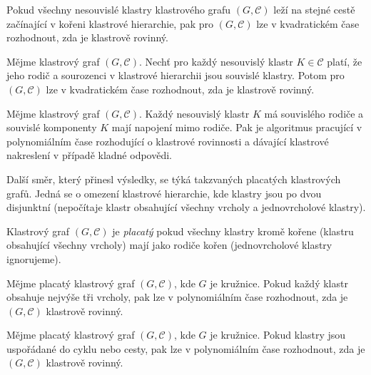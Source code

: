 \begin{theorem}
Pokud všechny nesouvislé klastry klastrového grafu $(G, \mathcal C)$ leží na stejné cestě začínající v kořeni klastrové hierarchie, pak pro $(G, \mathcal C)$ lze v kvadratickém čase rozhodnout, zda je klastrově rovinný.
\end{theorem}

\begin{theorem}
Mějme klastrový graf $(G, \mathcal C)$. Nechť pro každý nesouvislý klastr $K \in \mathcal C$ platí, že jeho rodič a sourozenci v klastrové hierarchii jsou souvislé klastry. Potom pro $(G, \mathcal C)$ lze v kvadratickém čase rozhodnout, zda je klastrově rovinný.
\end{theorem}

\begin{theorem}
Mějme klastrový graf $(G, \mathcal C)$. Každý nesouvislý klastr $K$ má souvislého rodiče a souvislé komponenty $K$ mají napojení mimo rodiče. Pak je algoritmus pracující v polynomiálním čase rozhodující o klastrové rovinnosti a dávající klastrové nakreslení v případě kladné odpovědi.
\end{theorem}

Další směr, který přinesl výsledky, se týká takzvaných placatých klastrových grafů. Jedná se o omezení klastrové hierarchie, kde klastry jsou po dvou disjunktní (nepočítaje klastr obsahující všechny vrcholy a jednovrcholové klastry).

\begin{defn}
Klastrový graf $(G, \mathcal C)$ je \textit{placatý} pokud všechny klastry kromě kořene (klastru obsahující všechny vrcholy) mají jako rodiče kořen (jednovrcholové klastry ignorujeme).
\end{defn}

\begin{theorem}
Mějme placatý klastrový graf  $(G, \mathcal C)$, kde $G$ je kružnice. Pokud každý klastr obsahuje nejvýše tři vrcholy, pak lze v polynomiálním čase rozhodnout, zda je  $(G, \mathcal C)$ klastrově rovinný.
\end{theorem}

\begin{theorem}
Mějme placatý klastrový graf  $(G, \mathcal C)$, kde $G$ je kružnice. Pokud klastry jsou uspořádané do cyklu nebo cesty, pak lze v polynomiálním čase rozhodnout, zda je  $(G, \mathcal C)$ klastrově rovinný.
\end{theorem}

